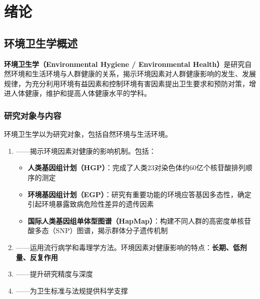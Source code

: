 \chapter{绪论}
\setcounter{chapter}{1}

\section{环境卫生学概述}

\begin{defbox}
\textbf{环境卫生学（Environmental Hygiene / Environmental Health）}是研究自然环境和生活环境与人群健康的关系，揭示环境因素对人群健康影响的发生、发展规律，为充分利用环境有益因素和控制环境有害因素提出卫生要求和预防对策，增进人体健康，维护和提高人体健康水平的学科。
\end{defbox}

\subsection{研究对象与内容}

环境卫生学以为研究对象，包括自然环境与生活环境。

\begin{tcolorbox}[colback=light, colframe=main, boxrule=0.5pt, arc=4pt, title=\textbf{环境卫生学的研究内容}, breakable]
\begin{enumerate}[leftmargin=*, itemsep=3pt]
    \item {}——揭示环境因素对健康的影响机制。包括：
    \begin{itemize}
        \item \textbf{人类基因组计划（HGP）}：完成了人类23对染色体约60亿个核苷酸排列顺序的测定
        \item \textbf{环境基因组计划（EGP）}：研究有重要功能的环境应答基因多态性，确定引起环境暴露致病危险性差异的遗传因素
        \item \textbf{国际人类基因组单体型图谱（HapMap）}：构建不同人群的高密度单核苷酸多态（SNP）图谱，揭示群体分子遗传机制
    \end{itemize}
    \item {}——运用流行病学和毒理学方法。环境因素对健康影响的特点：\textbf{长期、低剂量、反复作用}
    \item {}——提升研究精度与深度
    \item {}——为卫生标准与法规提供科学支撑
\end{enumerate}
\end{tcolorbox}

